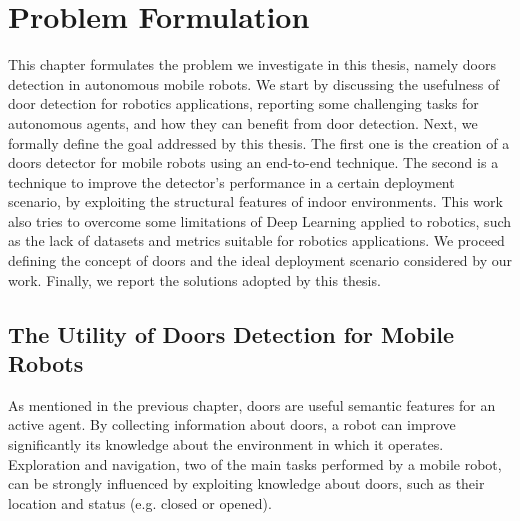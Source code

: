 \chapter{Problem Formulation}
\label{sec:chapter3}
\thispagestyle{empty}

This chapter formulates the problem we investigate in this thesis, namely doors detection in autonomous mobile robots. We start by discussing the usefulness of door detection for robotics applications, reporting some challenging tasks for autonomous agents, and how they can benefit from door detection. Next, we formally define the goal addressed by this thesis. The first one is the creation of a doors detector for mobile robots using an end-to-end technique. The second is a technique to improve the detector's performance in a certain deployment scenario, by exploiting the structural features of indoor environments. This work also tries to overcome some limitations of Deep Learning applied to robotics, such as the lack of datasets and metrics suitable for robotics applications. We proceed defining the concept of doors and the ideal deployment scenario considered by our work. Finally, we report the solutions adopted by this thesis.

\section{The Utility of Doors Detection for Mobile Robots}

As mentioned in the previous chapter, doors are useful semantic features for an active agent. By collecting information about doors, a robot can improve significantly its knowledge about the environment in which it operates. Exploration and navigation, two of the main tasks performed by a mobile robot, can be strongly influenced by exploiting knowledge about doors, such as their location and status (e.g. closed or opened). 

